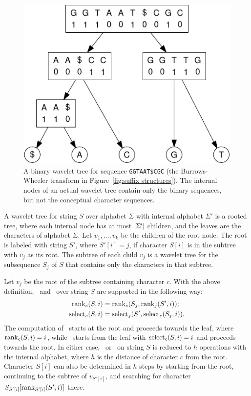 \begin{figure}
\centerline{\includegraphics{figures/wavelet.pdf}}
\caption{A binary wavelet tree for sequence \texttt{GGTAAT\${}CGC} (the Burrows-Wheeler transform in Figure~\ref{fig:suffix structures}). The internal nodes of an actual wavelet tree contain only the binary sequences, but not the conceptual character sequences.}
\label{fig:wavelet tree}
\end{figure}

\begin{definition}
A wavelet tree for string $S$ over alphabet $\Sigma$ with internal alphabet $\Sigma'$ is a rooted tree, where each internal node has at most $\lvert \Sigma' \rvert$ children, and the leaves are the characters of alphabet $\Sigma$. Let $v_{1}, \dotsc, v_{k}$ be the children of the root node. The root is labeled with string $S'$, where $S'[i] = j$, if character $S[i]$ is in the subtree with $v_{j}$ as its root. The subtree of each child $v_{j}$ is a wavelet tree for the subsequence $S_{j}$ of $S$ that contains only the characters in that subtree.
\end{definition}

Let $v_{j}$ be the root of the subtree containing character $c$. With the above definition, \rank\ and \select\ over string $S$ are supported in the following way:
\begin{align*}
\operatorname{rank}_{c}(S,i) & = \operatorname{rank}_{c}(S_{j}, \operatorname{rank}_{j}(S',i)); \\
\operatorname{select}_{c}(S,i) & = \operatorname{select}_{j}(S', \operatorname{select}_{c}(S_{j},i)).
\end{align*}
The computation of \rank\ starts at the root and proceeds towards the leaf, where $\operatorname{rank}_{c}(S,i) = i$, while \select\ starts from the leaf with $\operatorname{select}_{c}(S,i) = i$ and proceeds towards the root. In either case, \rank\ or \select\ on string $S$ is reduced to $h$ operations with the internal alphabet, where $h$ is the distance of character $c$ from the root. Character $S[i]$ can also be determined in $h$ steps by starting from the root, continuing to the subtree of $v_{S'[i]}$, and searching for character $S_{S'[i]}[\operatorname{rank}_{S'[i]}(S',i)]$ there.

